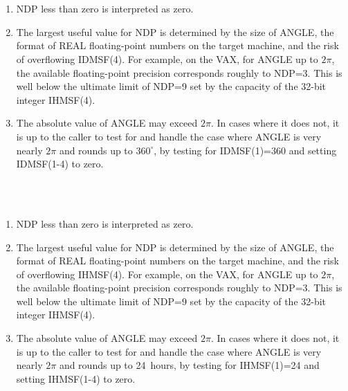 {
}
{
  \\
}
{
  \\
}
\notes
{
 \begin{enumerate}
  \item NDP less than zero is interpreted as zero.
  \item The largest useful value for NDP is determined by the size of
        ANGLE, the format of REAL floating-point numbers on the target
        machine, and the risk of overflowing IDMSF(4).  For example,
        on the VAX, for ANGLE up to $2\pi$, the available floating-point
        precision corresponds roughly to NDP=3.  This is well below
        the ultimate limit of NDP=9 set by the capacity of the 32-bit
        integer IHMSF(4).
  \item The absolute value of ANGLE may exceed $2\pi$.  In cases where it
        does not, it is up to the caller to test for and handle the
        case where ANGLE is very nearly $2\pi$ and rounds up to $360^{\circ}$,
        by testing for IDMSF(1)=360 and setting IDMSF(1-4) to zero.
 \end{enumerate}
}
{
}
{
  \\
}
{
  \\
}
\notes
{
 \begin{enumerate}
  \item NDP less than zero is interpreted as zero.
  \item The largest useful value for NDP is determined by the size of
        ANGLE, the format of REAL floating-point numbers on the target
        machine, and the risk of overflowing IHMSF(4).  For example,
        on the VAX, for ANGLE up to $2\pi$, the available floating-point
        precision corresponds roughly to NDP=3.  This is well below
        the ultimate limit of NDP=9 set by the capacity of the 32-bit
        integer IHMSF(4).
  \item The absolute value of ANGLE may exceed $2\pi$.  In cases where it
        does not, it is up to the caller to test for and handle the
        case where ANGLE is very nearly $2\pi$ and rounds up to 24~hours,
        by testing for IHMSF(1)=24 and setting IHMSF(1-4) to zero.
\end{enumerate}
}
